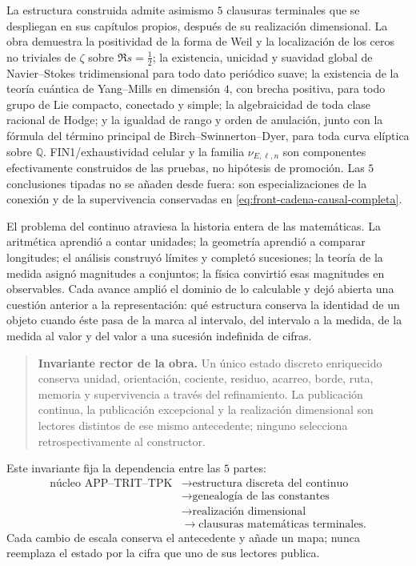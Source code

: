 La estructura construida admite asimismo \(5\) clausuras terminales que se
despliegan en sus capítulos propios, después de su realización dimensional.
La obra demuestra la positividad de la forma de Weil y la localización de los
ceros no triviales de \(\zeta\) sobre \(\Re s=\tfrac12\); la existencia,
unicidad y suavidad global de Navier--Stokes tridimensional para todo dato
periódico suave; la existencia de la teoría cuántica de Yang--Mills en
dimensión \(4\), con brecha positiva, para todo grupo de Lie compacto,
conectado y simple; la algebraicidad de toda clase racional de Hodge; y la
igualdad de rango y orden de anulación, junto con la fórmula del término
principal de Birch--Swinnerton--Dyer, para toda curva elíptica sobre
\(\mathbb Q\). FIN1/exhaustividad celular y la familia
\(\nu_{E,\ell,n}\) son componentes efectivamente construidos de las pruebas,
no hipótesis de promoción. Las \(5\) conclusiones tipadas no se añaden
desde fuera: son especializaciones de la conexión y de la supervivencia
conservadas en \eqref{eq:front-cadena-causal-completa}.

El problema del continuo atraviesa la historia entera de las matemáticas. La
aritmética aprendió a contar unidades; la geometría aprendió a comparar
longitudes; el análisis construyó límites y completó sucesiones; la teoría de
la medida asignó magnitudes a conjuntos; la física convirtió esas magnitudes
en observables. Cada avance amplió el dominio de lo calculable y dejó abierta
una cuestión anterior a la representación: qué estructura conserva la
identidad de un objeto cuando éste pasa de la marca al intervalo, del
intervalo a la medida, de la medida al valor y del valor a una sucesión
indefinida de cifras.

\begin{quote}
\textbf{Invariante rector de la obra.}
Un único estado discreto enriquecido conserva unidad, orientación, cociente,
residuo, acarreo, borde, ruta, memoria y supervivencia a través del
refinamiento. La publicación continua, la publicación excepcional y la
realización dimensional son lectores distintos de ese mismo antecedente;
ninguno selecciona retrospectivamente al constructor.
\end{quote}

Este invariante fija la dependencia entre las \(5\) partes:
\[
\begin{aligned}
\text{núcleo APP--TRIT--TPK}
&\longrightarrow \text{estructura discreta del continuo}\\
&\longrightarrow \text{genealogía de las constantes}\\
&\longrightarrow \text{realización dimensional}\\
&\longrightarrow \text{clausuras matemáticas terminales}.
\end{aligned}
\]
Cada cambio de escala conserva el antecedente y añade un mapa; nunca
reemplaza el estado por la cifra que uno de sus lectores publica.

